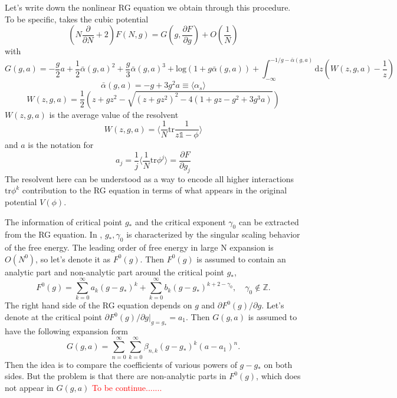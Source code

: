 Let's write down the nonlinear RG equation we obtain through this procedure. To be specific, \cite{higuchi_renormalization_1995} takes the cubic potential
\begin{equation}
    \left(N\frac{\partial}{\partial N} + 2\right) F(N,g) = G(g,\frac{\partial F}{\partial g}) + O(\frac{1}{N})
\end{equation}
with
\[G(g,a) = -\frac{g}{2}a + \frac{1}{2}\bar{\alpha}(g,a)^2 + \frac{g}{3}\bar{\alpha}(g,a)^3 + \mathrm{log}(1 + g\bar{\alpha}(g,a)) + \int_{-\infty}^{-1/g-\bar{\alpha}(g,a)}\mathrm{d}z \left(W(z,g,a) - \frac{1}{z}\right)\]
\[\bar{\alpha}(g,a) = -g + 3 g^2 a \equiv \langle \alpha_s \rangle\]
\[W(z,g,a) = \frac{1}{2}\left(z + gz^2 - \sqrt{(z+gz^2)^2 - 4(1+gz-g^2+3g^3 a)}\right)\]
$W(z,g,a)$ is the average value of the resolvent
\[W(z,g,a) = \langle \frac{1}{N}\mathrm{tr}\frac{1}{z\mathds{1}-\phi}\rangle\]
and $a$ is the notation for
\[a_j = \frac{1}{j}\langle \frac{1}{N}\mathrm{tr}\phi^j \rangle = \frac{\partial F}{\partial g_j}\]
The resolvent here can be understood as a way to encode all higher interactions $\mathrm{tr}\phi^k$ contribution to the RG equation in terms of what appears in the original potential $V(\phi)$.

The information of critical point $g_*$ and the critical exponent $\gamma_0$ can be extracted from the RG equation. In \cite{higuchi_renormalization_1995}, $g_*,\gamma_0$ is characterized by the singular scaling behavior of the free energy. The leading order of free energy in large N expansion is $O(N^0)$, so let's denote it as $F^0(g)$. Then $F^0(g)$ is assumed to contain an analytic part and non-analytic part around the critical point $g_*$,
\begin{equation}
    F^0(g) = \sum_{k=0}^{\infty} a_k(g-g_*)^k + \sum_{k=0}^{\infty} b_k(g-g_*)^{k+2-\gamma_0},\quad \gamma_0\notin \mathbb{Z}.
\end{equation}
The right hand side of the RG equation depends on $g$ and $\partial F^0(g)/\partial g$. Let's denote at the critical point $\partial F^0(g)/\partial g\vert _{g=g_*} = a_1$. Then $G(g,a)$ is assumed to have the following expansion form
\begin{equation}
    G(g,a) = \sum_{n=0}^{\infty} \sum_{k=0}^{\infty} \beta_{n,k} (g-g_*)^k (a-a_1)^n.
\end{equation}
Then the idea is to compare the coefficients of various powers of $g-g_*$ on both sides. But the problem is that there are non-analytic parts in $F^0(g)$, which does not appear in $G(g,a)$ \textcolor{red}{To be continue.......}

